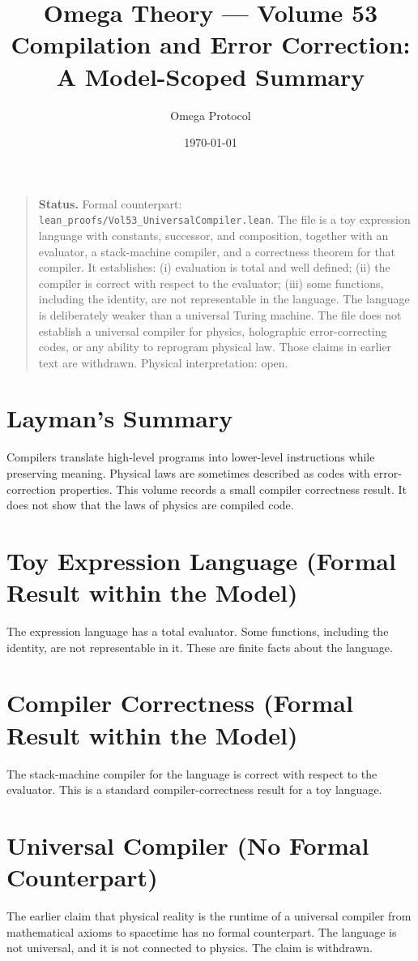 \documentclass[11pt, a4paper]{article}
\title{Omega Theory --- Volume 53\\\Large Compilation and Error Correction: A Model-Scoped Summary}
\author{Omega Protocol}
\date{\today}
\begin{document}
\maketitle

\begin{quote}
\textbf{Status.} Formal counterpart: \texttt{lean\_proofs/Vol53\_UniversalCompiler.lean}. The file is a toy expression language with constants, successor, and composition, together with an evaluator, a stack-machine compiler, and a correctness theorem for that compiler. It establishes: (i) evaluation is total and well defined; (ii) the compiler is correct with respect to the evaluator; (iii) some functions, including the identity, are not representable in the language. The language is deliberately weaker than a universal Turing machine. The file does not establish a universal compiler for physics, holographic error-correcting codes, or any ability to reprogram physical law. Those claims in earlier text are withdrawn. Physical interpretation: open.
\end{quote}

\section*{Layman's Summary}
Compilers translate high-level programs into lower-level instructions while preserving meaning. Physical laws are sometimes described as codes with error-correction properties. This volume records a small compiler correctness result. It does not show that the laws of physics are compiled code.

\section{Toy Expression Language (Formal Result within the Model)}
The expression language has a total evaluator. Some functions, including the identity, are not representable in it. These are finite facts about the language.

\section{Compiler Correctness (Formal Result within the Model)}
The stack-machine compiler for the language is correct with respect to the evaluator. This is a standard compiler-correctness result for a toy language.

\section{Universal Compiler (No Formal Counterpart)}
The earlier claim that physical reality is the runtime of a universal compiler from mathematical axioms to spacetime has no formal counterpart. The language is not universal, and it is not connected to physics. The claim is withdrawn.
\end{document}
